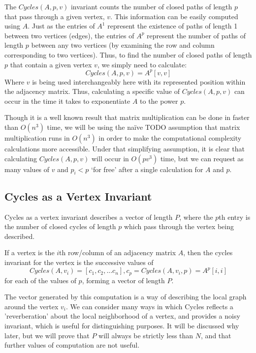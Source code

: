 The $Cycles(A, p, v)$ invariant counts the number of closed paths of length $p$ that pass through a given vertex, $v$. 
This information can be easily computed using $A$. 
Just as the entries of $A^1$ represent the existence of paths of length 1 between two vertices (edges), the entries of $A^p$ represent the number of paths of length $p$ between any two vertices (by examining the row and column corresponding to two vertices).
Thus, to find the number of closed paths of length $p$ that contain a given vertex $v$, we simply need to calculate: 
$$Cycles(A, p, v) = A^p[v, v]$$
Where $v$ is being used interchangeably here with its represented position within the adjacency matrix. 
Thus, calculating a specific value of $Cycles(A, p, v)$ can occur in the time it takes to exponentiate $A$ to the power $p$.

Though it is a well known result that matrix multiplication can be done in faster than $O(n^3)$ time, we will be using the na\"{i}ve TODO assumption that matrix multiplication runs in $O(n^3)$ in order to make the computational complexity calculations more accessible.  
Under that simplifying assumption, it is clear that calculating $Cycles(A, p, v)$ will occur in $O(pv^3)$ time, but we can request as many values of $v$ and $p_i < p$ `for free' after a single calculation for $A$ and $p$.


\subsection{Cycles as a Vertex Invariant}

Cycles as a vertex invariant describes a vector of length $P$, where the $p$th entry is the number of closed cycles of length $p$ which pass through the vertex being described.

If a vertex is the $i$th row/column of an adjacency matrix $A$, then the cycles invariant for the vertex is the successive values of 
$$Cycles(A, v_i) = [c_1, c_2, ... c_n] , c_p = Cycles(A, v_i, p) = A^p[i,i]$$
for each of the values of $p$, forming a vector of length $P$.

The vector generated by this computation is a way of describing the local graph around the vertex $v_i$.
We can consider many ways in which Cycles reflects a 'reverberation' about the local neighborhood of a vertex, and provides a noisy invariant, which is useful for distinguishing purposes. 
It will be discussed why later, but we will prove that $P$ will always be strictly less than $N$, and that further values of computation are not useful.


